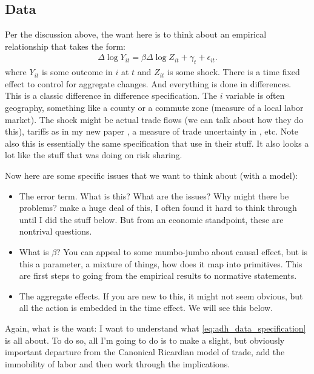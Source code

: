 \documentclass[pdftex,12pt]{article}
\begin{document}
\subsection{Data}

Per the discussion above, the want here is to think about an empirical relationship that takes the form:
\begin{align}
\Delta \log Y_{it} = \beta \Delta \log Z_{it} + \gamma_t + \epsilon_{it}.
\label{eq:adh_data_specification}
\end{align}
where $Y_{it}$ is some outcome in $i$ at $t$ and $Z_{it}$ is some shock. There is a time fixed effect to control for aggregate changes. And everything is done in differences. This is a classic difference in difference specification. The $i$ variable is often geography, something like a county or a commute zone (measure of a local labor market). The shock might be actual trade flows (we can talk about how they do this), tariffs as in my new paper \citet{waugh_consumption}, a measure of trade uncertainty in \citet{pierce2016surprisingly}, etc. Note also this is essentially the same specification that \citet{mian2013household} use in their stuff. It also looks a lot like the stuff that \citet{townsend1994risk} was doing on risk sharing. 

Now here are some specific issues that we want to think about (with a model):
\begin{itemize}
\item The error term. What is this? What are the issues? Why might there be problems? \citet{david2013china} make a huge deal of this, I often found it hard to think through until I did the stuff below. But from an economic standpoint, these are nontrival questions.
    
\item What is $\beta$? You can appeal to some mumbo-jumbo about causal effect, but is this a parameter, a mixture of things, how does it map into primitives. This are first steps to going from the empirical results to normative statements. 
    
\item The aggregate effects. If you are new to this, it might not seem obvious, but all the action is embedded in the time effect. We will see this below.
\end{itemize}
Again, what is the want: I want to understand what \ref{eq:adh_data_specification} is all about. To do so, all I'm going to do is to make a slight, but obviously important departure from the Canonical Ricardian model of trade, add the immobility of labor and then work through the implications. 
\end{document}
